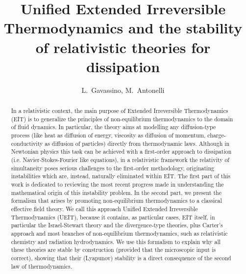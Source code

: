 \documentclass[a4paper, amsfonts, amssymb, amsmath, reprint, twocolumn, showkeys, nofootinbib]{revtex4-2}
\begin{document}
\author{
 L.~Gavassino, M.~Antonelli
}


\vspace{2mm}


\title{
Unified Extended Irreversible Thermodynamics and the stability\\ 
of relativistic theories for dissipation
} 
 
 
\begin{abstract}
In a relativistic context, the main purpose of Extended Irreversible Thermodynamics (EIT) is to generalize the principles of non-equilibrium thermodynamics to the domain of fluid dynamics. In particular, the theory aims at modelling any diffusion-type process (like heat as diffusion of energy, viscosity as diffusion of momentum, charge-conductivity as diffusion of particles) directly from thermodynamic laws. Although in Newtonian physics this task can be achieved with a first-order approach to dissipation (i.e. Navier-Stokes-Fourier like equations), in a relativistic framework the relativity of simultaneity poses serious challenges to the first-order methodology, originating instabilities which are, instead, naturally eliminated within EIT. 
The first part of this work is dedicated to reviewing the most recent progress made in understanding the mathematical origin of this instability problem. 
In the second part, we present the formalism that arises by promoting non-equilibrium thermodynamics to a classical effective field theory. We call this approach Unified Extended Irreversible Thermodynamics (UEIT), because it contains, as particular cases, EIT itself, in particular the Israel-Stewart theory and the divergence-type theories, plus Carter's approach and most branches of non-equilibrium thermodynamics, such as relativistic chemistry and radiation hydrodynamics. 
We use this formalism to explain why all these theories are stable by construction (provided that the microscopic input is correct), showing that their (Lyapunov) stability is a direct consequence of the second law of thermodynamics.
\end{abstract}
\end{document}
